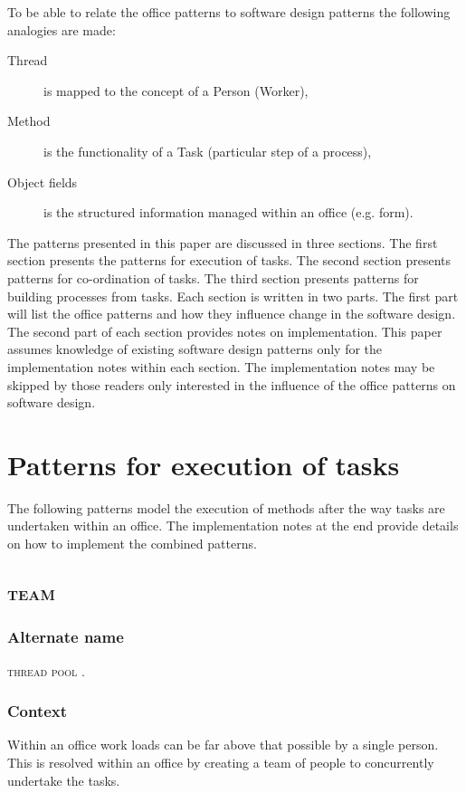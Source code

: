 \documentclass[prodmode]{style/acmlarge}
\begin{document}
To be able to relate the office patterns to software design patterns the
following analogies are made:
\begin{description}
  \item[Thread] is mapped to the concept of a Person (Worker),
  \item[Method] is the functionality of a Task (particular step of a process),
  \item[Object fields] is the structured information managed within an office (e.g. form).
\end{description}

The patterns presented in this paper are discussed in three sections.  The first
section presents the patterns for execution of tasks.  The second section
presents patterns for co-ordination of tasks.  The third section presents
patterns for building processes from tasks.  Each section is written in two
parts.  The first part will list the office patterns and how they influence
change in the software design.  The second part of each section provides notes
on implementation.  This paper assumes knowledge of existing software design
patterns only for the implementation notes within each section.  The
implementation notes may be skipped by those readers only interested in the
influence of the office patterns on software design.



\section{Patterns for execution of tasks}

The following patterns model the execution of methods after the way tasks are
undertaken within an office.  The implementation notes at the end provide
details on how to implement the combined patterns.


\subsection{\textsc{\textbf{team}}}

\subsubsection*{Alternate name} \textsc{thread pool} \cite{thread-per-request}.

\subsubsection*{Context} Within an office work loads can be far above that
possible by a single person. This is resolved within an office by creating a
team of people to concurrently undertake the tasks.
\end{document}
